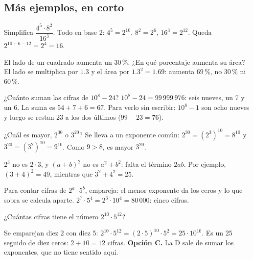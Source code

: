 \subsection{Más ejemplos, en corto}
\begin{ejemplo}
Simplifica $\dfrac{4^5 \cdot 8^2}{16^3}$.
\solucion Todo en base 2: $4^5 = 2^{10}$, $8^2 = 2^6$, $16^3 = 2^{12}$. Queda $2^{10 + 6 - 12} = 2^4 = 16$.
\end{ejemplo}

\begin{ejemplo}
El lado de un cuadrado aumenta un $30\,\%$. ¿En qué porcentaje aumenta su área?
\solucion El lado se multiplica por $1.3$ y el área por $1.3^2 = 1.69$: aumenta $69\,\%$, no $30\,\%$ ni $60\,\%$.
\end{ejemplo}

\begin{ejemplo}
¿Cuánto suman las cifras de $10^{8} - 24$?
\solucion $10^8 - 24 = 99\,999\,976$: seis nueves, un 7 y un 6. La suma es $54 + 7 + 6 = 67$. Para verlo sin escribir:
$10^8 - 1$ son ocho nueves y luego se restan 23 a los dos últimos ($99 - 23 = 76$).
\end{ejemplo}

\begin{ejemplo}
¿Cuál es mayor, $2^{30}$ o $3^{20}$?
\solucion Se lleva a un exponente común: $2^{30} = (2^3)^{10} = 8^{10}$ y $3^{20} = (3^2)^{10} = 9^{10}$. Como $9 > 8$,
es mayor $3^{20}$.
\end{ejemplo}

\begin{trampa}
$2^3$ no es $2 \cdot 3$, y $(a + b)^2$ no es $a^2 + b^2$: falta el término $2ab$. Por ejemplo, $(3 + 4)^2 = 49$, mientras
que $3^2 + 4^2 = 25$.
\end{trampa}

\begin{atajo}
Para contar cifras de $2^a \cdot 5^b$, empareja: el menor exponente da los ceros y lo que sobra se calcula aparte.
$2^7 \cdot 5^4 = 2^3 \cdot 10^4 = 80\,000$: cinco cifras.
\end{atajo}

\begin{reto}
¿Cuántas cifras tiene el número $2^{10} \cdot 5^{12}$?
\end{reto}

\begin{retoresuelto}
Se emparejan diez 2 con diez 5: $2^{10} \cdot 5^{12} = (2 \cdot 5)^{10} \cdot 5^2 = 25 \cdot 10^{10}$. Es un 25 seguido
de diez ceros: $2 + 10 = 12$ cifras. \textbf{Opción C.} La D sale de sumar los exponentes, que no tiene sentido aquí.
\end{retoresuelto}

